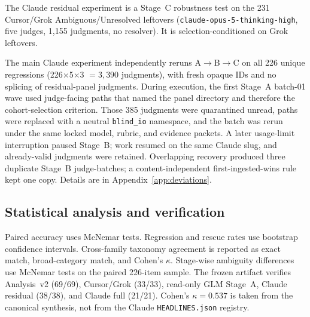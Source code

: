 The Claude residual experiment is a Stage~C robustness test on the 231 Cursor/Grok Ambiguous/Unresolved leftovers (\texttt{claude-opus-5-thinking-high}, five judges, 1{,}155 judgments, no resolver).
It is selection-conditioned on Grok leftovers.

The main Claude experiment independently reruns A$\rightarrow$B$\rightarrow$C on all 226 unique regressions (226$\times$5$\times$3 $= 3{,}390$ judgments), with fresh opaque IDs and no splicing of residual-panel judgments.
During execution, the first Stage~A batch-01 wave used judge-facing paths that named the panel directory and therefore the cohort-selection criterion.
Those 385 judgments were quarantined unread, paths were replaced with a neutral \texttt{blind\_io} namespace, and the batch was rerun under the same locked model, rubric, and evidence packets.
A later usage-limit interruption paused Stage~B; work resumed on the same Claude slug, and already-valid judgments were retained.
Overlapping recovery produced three duplicate Stage~B judge-batches; a content-independent first-ingested-wins rule kept one copy.
Details are in Appendix~\ref{app:deviations}.

\subsection{Statistical analysis and verification}
Paired accuracy uses McNemar tests.
Regression and rescue rates use bootstrap confidence intervals.
Cross-family taxonomy agreement is reported as exact match, broad-category match, and Cohen's $\kappa$.
Stage-wise ambiguity differences use McNemar tests on the paired 226-item sample.
The frozen artifact verifies Analysis~v2 (69/69), Cursor/Grok (33/33), read-only GLM Stage~A, Claude residual (38/38), and Claude full (21/21).
Cohen's $\kappa=0.537$ is taken from the canonical synthesis, not from the Claude \texttt{HEADLINES.json} registry.
